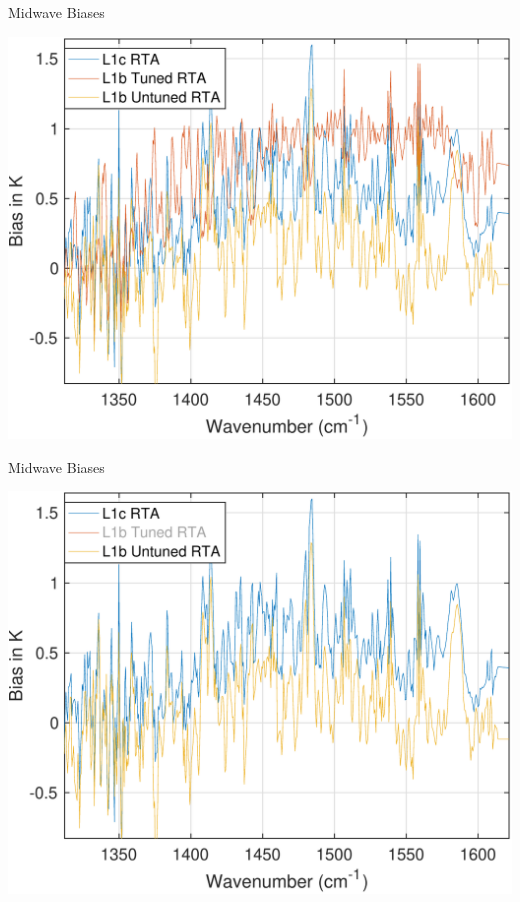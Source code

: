 \documentclass[10pt,t]{beamer}
\begin{document}
\begin{frame}[label={sec:org68cebb3}]{Midwave Biases}
\begin{center}
\includegraphics[width=0.75\linewidth]{./Talk2/bias_3rta_mw.pdf}
\end{center}
\end{frame}

\begin{frame}[label={sec:org5d2824b}]{Midwave Biases}
\addtocounter{framenumber}{-1}
  \begin{center}
\includegraphics[width=0.75\linewidth]{./Talk2/bias_3rta_mw_noL1btuning.pdf}
\end{center}
\end{frame}
\end{document}

